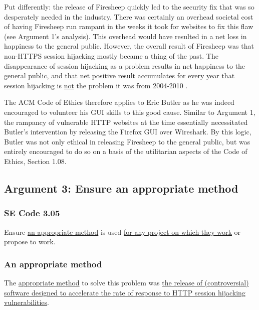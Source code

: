 \documentclass[11pt]{article}
\begin{document}
\begin{multicols}{2}
Put differently: the release of Firesheep quickly led to the security fix that was so desperately needed in the industry. There was certainly an overhead societal cost of having Firesheep run rampant in the weeks it took for websites to fix this flaw (see Argument 1's analysis). This overhead would have resulted in a net loss in happiness to the general public. However, the overall result of Firesheep was that non-HTTPS session hijacking mostly became a thing of the past. The disappearance of session hijacking as a problem results in net happiness to the general public, and that net positive result accumulates for every year that session hijacking is \uline{not} the problem it was from 2004-2010 \cite{firesheep-day-later}.

The ACM Code of Ethics therefore applies to Eric Butler as he was indeed encouraged to volunteer his GUI skills to this good cause. Similar to Argument 1, the rampancy of vulnerable HTTP websites at the time essentially necessitated Butler's intervention by releasing the Firefox GUI over Wireshark. By this logic, Butler was not only ethical in releasing Firesheep to the general public, but was entirely encouraged to do so on a basis of the utilitarian aspects of the Code of Ethics, Section 1.08.


\subsection{Argument 3: Ensure an appropriate method}
\subsubsection{SE Code 3.05}
Ensure \uline{an appropriate method} is used \uline{for any project on which they work} or propose to work.

\subsubsection{An appropriate method}
The \uline{appropriate method} to solve this problem was \uline{the release of (controversial) software designed to accelerate the rate of response to HTTP session hijacking vulnerabilities}.


\end{multicols}
\end{document}
